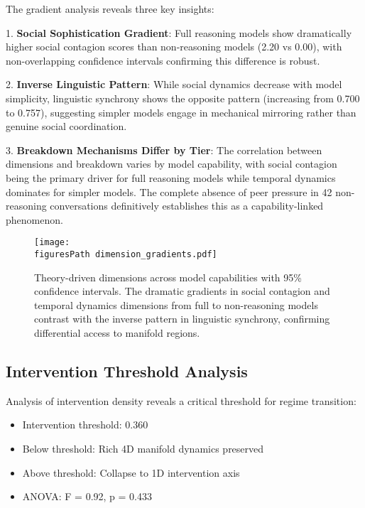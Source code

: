 \documentclass[11pt,letterpaper]{article}
\newcommand{\nonReasoningCount}{42}
\newcommand{\interventionThreshold}{0.360}
\newcommand{\interventionThresholdPValue}{0.433}
\newcommand{\socialContagionFullMean}{2.20}
\newcommand{\socialContagionNoMean}{0.00}
\newcommand{\fullLinguisticAlignment}{0.700}
\newcommand{\nonLinguisticAlignment}{0.757}
\newcommand{\figuresPath}{../analysis/analysis_outputs_n110/figures/}
\begin{document}
The gradient analysis reveals three key insights:

1. \textbf{Social Sophistication Gradient}: Full reasoning models show dramatically higher social contagion scores than non-reasoning models (\socialContagionFullMean{} vs \socialContagionNoMean{}), with non-overlapping confidence intervals confirming this difference is robust.

2. \textbf{Inverse Linguistic Pattern}: While social dynamics decrease with model simplicity, linguistic synchrony shows the opposite pattern (increasing from \fullLinguisticAlignment{} to \nonLinguisticAlignment{}), suggesting simpler models engage in mechanical mirroring rather than genuine social coordination.

3. \textbf{Breakdown Mechanisms Differ by Tier}: The correlation between dimensions and breakdown varies by model capability, with social contagion being the primary driver for full reasoning models while temporal dynamics dominates for simpler models. The complete absence of peer pressure in \nonReasoningCount{} non-reasoning conversations definitively establishes this as a capability-linked phenomenon.

\begin{figure}[htbp]
\centering
\texttt{[image: \\figuresPath dimension\_gradients.pdf]}
\caption{Theory-driven dimensions across model capabilities with 95\% confidence intervals. The dramatic gradients in social contagion and temporal dynamics dimensions from full to non-reasoning models contrast with the inverse pattern in linguistic synchrony, confirming differential access to manifold regions.}
\label{fig:dimension_gradients}
\end{figure}

\subsection{Intervention Threshold Analysis}

Analysis of intervention density reveals a critical threshold for regime transition:

\begin{itemize}
    \item Intervention threshold: \interventionThreshold{}
    \item Below threshold: Rich 4D manifold dynamics preserved
    \item Above threshold: Collapse to 1D intervention axis
    \item ANOVA: F = 0.92, p = \interventionThresholdPValue{}
\end{itemize}
\end{document}

